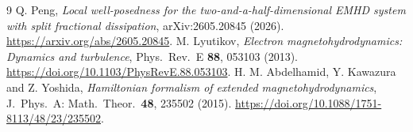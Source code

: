 \documentclass[11pt,a4paper]{article}
\begin{document}
\begin{thebibliography}{9}
Q. Peng, \emph{Local well-posedness for the two-and-a-half-dimensional
EMHD system with split fractional dissipation},
arXiv:2605.20845 (2026).
\url{https://arxiv.org/abs/2605.20845}.
M. Lyutikov, \emph{Electron magnetohydrodynamics: Dynamics and turbulence},
Phys.\ Rev.\ E \textbf{88}, 053103 (2013).
\url{https://doi.org/10.1103/PhysRevE.88.053103}.
H. M. Abdelhamid, Y. Kawazura and Z. Yoshida,
\emph{Hamiltonian formalism of extended magnetohydrodynamics},
J.\ Phys.\ A: Math.\ Theor.\ \textbf{48}, 235502 (2015).
\url{https://doi.org/10.1088/1751-8113/48/23/235502}.
\end{thebibliography}
\end{document}
